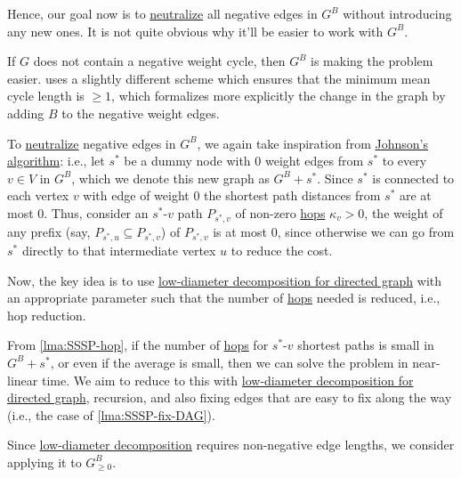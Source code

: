 Hence, our goal now is to \hyperref[def:neutralize]{neutralize} all negative edges in \(G^B\) without introducing any new ones. It is not quite obvious why it'll be easier to work with \(G^B\).

\begin{intuition}
	If \(G\) does not contain a negative weight cycle, then \(G^B\) is making the problem easier. \cite{bringmann2023negative} uses a slightly different scheme which ensures that the minimum mean cycle length is \(\geq 1\), which formalizes more explicitly the change in the graph by adding \(B\) to the negative weight edges.
\end{intuition}

To \hyperref[def:neutralize]{neutralize} negative edges in \(G^B\), we again take inspiration from \hyperref[prev:Johnson-algorithm]{Johnson's algorithm}: i.e., let \(s^{\ast} \) be a dummy node with \(0\) weight edges from \(s^{\ast} \) to every \(v \in V\) in \(G^B\), which we denote this new graph as \(G^B + s^{\ast} \). Since \(s^{\ast} \) is connected to each vertex \(v\) with edge of weight \(0\) the shortest path distances from \(s^{\ast} \) are at most \(0\). Thus, consider an \(s^{\ast} \)-\(v\) path \(P_{s^{\ast} , v}\) of non-zero \hyperref[not:hop]{hops} \(\kappa _v > 0\), the weight of any prefix (say, \(P_{s^{\ast} , u} \subseteq P_{s^{\ast} , v}\)) of \(P_{s^{\ast} , v}\) is at most \(0\), since otherwise we can go from \(s^{\ast} \) directly to that intermediate vertex \(u\) to reduce the cost.

Now, the key idea is to use \hyperref[thm:directed-LDD]{low-diameter decomposition for directed graph} with an appropriate parameter such that the number of \hyperref[not:hop]{hops} needed is reduced, i.e., hop reduction.

\begin{intuition}
	From \autoref{lma:SSSP-hop}, if the number of \hyperref[not:hop]{hops} for \(s^{\ast} \)-\(v\) shortest paths is small in \(G^B + s^{\ast} \), or even if the average is small, then we can solve the problem in near-linear time. We aim to reduce to this with \hyperref[thm:directed-LDD]{low-diameter decomposition for directed graph}, recursion, and also fixing edges that are easy to fix along the way (i.e., the case of \autoref{lma:SSSP-fix-DAG}).
\end{intuition}

Since \hyperref[thm:directed-LDD]{low-diameter decomposition} requires non-negative edge lengths, we consider applying it to \(G_{\geq 0}^B \).

